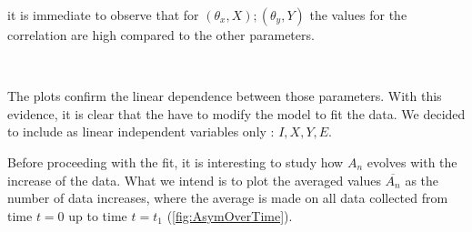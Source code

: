 it is immediate to observe that for $(\theta_{x},X);(\theta_{y},Y)$ the values for the correlation are high compared to the other parameters. 

\begin{figure}[h]
\centering
{}
\\
\end{figure}

The plots confirm the linear dependence between those parameters. With this evidence, it is clear that the have to modify the model to fit the data. We decided to include as linear independent variables only : $I,X,Y,E$.

Before proceeding with the fit, it is interesting to study how $A_{n}$ evolves with the increase of the data. What we intend is to plot the averaged values $\overline{A_{n}}$ as the number of data increases, where the average is made on all data collected from time $t = 0$ up to time $t = t_{1}$ (\ref{fig:AsymOverTime}). 

